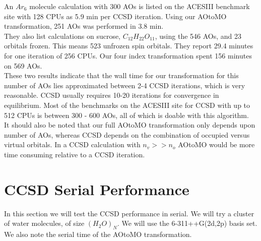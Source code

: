 An $Ar_6$ molecule calculation with 300 AOs is listed on the ACESIII benchmark site
with 128 CPUs as 5.9 min per CCSD iteration. Using our AOtoMO
transformation, 251 AOs was performed in 3.8 min. \\

They also list calculations on sucrose, $C_{12} H_{22} O_{11}$, using
the 546 AOs, and 23 orbitals frozen. This means 523 unfrozen spin
orbitals. They report 29.4 minutes for one iteration of 256 CPUs. Our
four index transformation spent 156 minutes on 569 AOs. \\

These two results indicate that the wall time for our transformation
for this number of AOs lies approximated between 2-4 CCSD iterations,
which is very reasonable. CCSD usually requires 10-20 iterations for
convergence in equilibrium. Most of the benchmarks on the ACESIII site
for CCSD with up to 512 CPUs is between 300 - 600 AOs, all of which is
doable with this algorithm. \\

It should also be noted that our full AOtoMO transformation only
depends upon number of AOs, whereas CCSD depends on the combination of
occupied versus virtual orbitals. In a CCSD calculation with $n_v >>
n_o$ AOtoMO would be more time consuming relative to a CCSD iteration.

\section{CCSD Serial Performance \label{ccsdserialperformance_ppp}}
In this section we will test the CCSD performance in serial. We will
try a cluster of water molecules, of size $(H_2O)_N$. We will use the
6-311++G(2d,2p) basis set. We also note the serial time of the AOtoMO
transformation.

